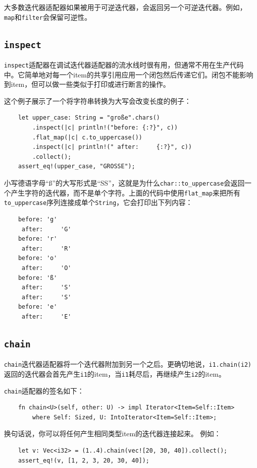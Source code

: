 大多数迭代器适配器如果被用于可逆迭代器，会返回另一个可逆迭代器。例如，\texttt{map}和\texttt{filter}会保留可逆性。

\subsection{\texttt{inspect}}
\texttt{inspect}适配器在调试迭代器适配器的流水线时很有用，但通常不用在生产代码中。它简单地对每一个item的共享引用应用一个闭包然后传递它们。闭包不能影响到item，但可以做一些类似于打印或进行断言的操作。

这个例子展示了一个将字符串转换为大写会改变长度的例子：
\begin{verbatim}
    let upper_case: String = "große".chars()
        .inspect(|c| println!("before: {:?}", c))
        .flat_map(|c| c.to_uppercase())
        .inspect(|c| println!(" after:     {:?}", c))
        .collect();
    assert_eq!(upper_case, "GROSSE");
\end{verbatim}

小写德语字母“ß”的大写形式是“SS”，这就是为什么\texttt{char::to\_uppercase}会返回一个产生字符的迭代器，而不是单个字符。上面的代码中使用\texttt{flat\_map}来把所有\texttt{to\_uppercase}序列连接成单个\texttt{String}，它会打印出下列内容：
\begin{verbatim}
    before: 'g'
     after:     'G'
    before: 'r'
     after:     'R'
    before: 'o'
     after:     'O'
    before: 'ß'
     after:     'S'
     after:     'S'
    before: 'e'
     after:     'E'
\end{verbatim}

\subsection{\texttt{chain}}
\texttt{chain}迭代器适配器将一个迭代器附加到另一个之后。更确切地说，\texttt{i1.chain(i2)}返回的迭代器会首先产生\texttt{i1}的item，当\texttt{i1}耗尽后，再继续产生\texttt{i2}的item。

\texttt{chain}适配器的签名如下：
\begin{verbatim}
    fn chain<U>(self, other: U) -> impl Iterator<Item=Self::Item>
        where Self: Sized, U: IntoIterator<Item=Self::Item>;
\end{verbatim}

换句话说，你可以将任何产生相同类型item的迭代器连接起来。
例如：
\begin{verbatim}
    let v: Vec<i32> = (1..4).chain(vec![20, 30, 40]).collect();
    assert_eq!(v, [1, 2, 3, 20, 30, 40]);
\end{verbatim}

